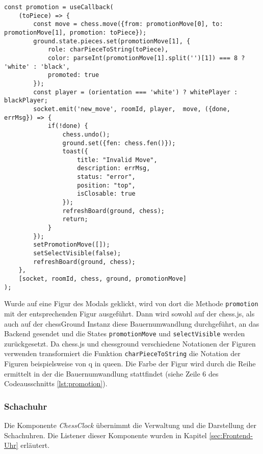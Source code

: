 \begin{lstlisting}[style=codeStyle, caption={Die promotion Methode}, label={lst:promotion}]
const promotion = useCallback(
    (toPiece) => {
        const move = chess.move({from: promotionMove[0], to: promotionMove[1], promotion: toPiece});
        ground.state.pieces.set(promotionMove[1], {
            role: charPieceToString(toPiece),
            color: parseInt(promotionMove[1].split('')[1]) === 8 ? 'white' : 'black',
            promoted: true
        });
        const player = (orientation === 'white') ? whitePlayer : blackPlayer;
        socket.emit('new_move', roomId, player,  move, ({done, errMsg}) => {
            if(!done) {
                chess.undo();
                ground.set({fen: chess.fen()});
                toast({
                    title: "Invalid Move",
                    description: errMsg,
                    status: "error",
                    position: "top",
                    isClosable: true
                });
                refreshBoard(ground, chess);
                return;
            }
        });
        setPromotionMove([]);
        setSelectVisible(false);
        refreshBoard(ground, chess);
    },
    [socket, roomId, chess, ground, promotionMove]
);
\end{lstlisting}

Wurde auf eine Figur des Modals geklickt, wird von dort die Methode \verb|promotion| mit der entsprechenden Figur ausgeführt. Dann wird sowohl auf der chess.js, als auch auf der chessGround Instanz diese Bauernumwandlung durchgeführt, an das Backend gesendet und die States \verb|promotionMove| und \verb|selectVisible| werden zurückgesetzt. Da chess.js und chessground verschiedene Notationen der Figuren verwenden transformiert die Funktion \verb|charPieceToString| die Notation der Figuren beispielsweise von \glqq q\grqq{ } in \glqq queen\grqq . Die Farbe der Figur wird durch die Reihe ermittelt in der die Bauernumwandlung stattfindet (siehe Zeile 6 des Codeausschnitts \ref{lst:promotion}).

\subsubsection{Schachuhr}
\label{sec:impl-schachuhr}
Die Komponente \textit{ChessClock} übernimmt die Verwaltung und die Darstellung der Schachuhren. Die Listener dieser Komponente wurden in Kapitel \ref{sec:Frontend-Uhr} erläutert.

